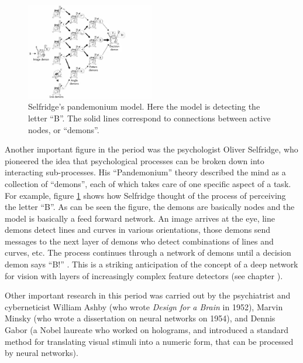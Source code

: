 \begin{figure}[h]
\centering
\includegraphics[width=0.5\textwidth]{./images/Selfridge.png}
\caption[From Groome, 2013 \cite{groome2013introduction}]{Selfridge's pandemonium model. Here the model is detecting the letter ``B''. The solid lines correspond to connections between active nodes, or ``demons''.}
\label{selfridge}
\end{figure}

Another important figure in the period was the psychologist Oliver Selfridge, who pioneered the idea that psychological processes can be broken down into interacting sub-processes. His ``Pandemonium'' theory described the mind as a collection of ``demons'', each of which takes care of one specific aspect of a task. For example, figure \ref{selfridge} shows how Selfridge thought of the process of perceiving the letter ``B''. As can be seen the figure, the demons are basically nodes and the model is basically a feed forward network. An image arrives at the eye, line demons detect lines and curves in various orientations, those demons send messages to the next layer of demons who detect combinations of lines and curves, etc. The process continues through a network of demons until a decision demon says ``B!'' \cite{selfridge1958pandemonium}.  This is a striking anticipation of the concept of a deep network for vision with layers of increasingly complex feature detectors (see chapter ).

Other important research in this period was carried out by the psychiatrist and cyberneticist William Ashby (who wrote \emph{Design for a Brain} in 1952), Marvin Minsky (who wrote a dissertation on neural networks on 1954), and Dennis Gabor (a Nobel laureate who worked on holograms, and introduced a standard method for translating visual stimuli into a numeric form, that can be processed by neural networks).

